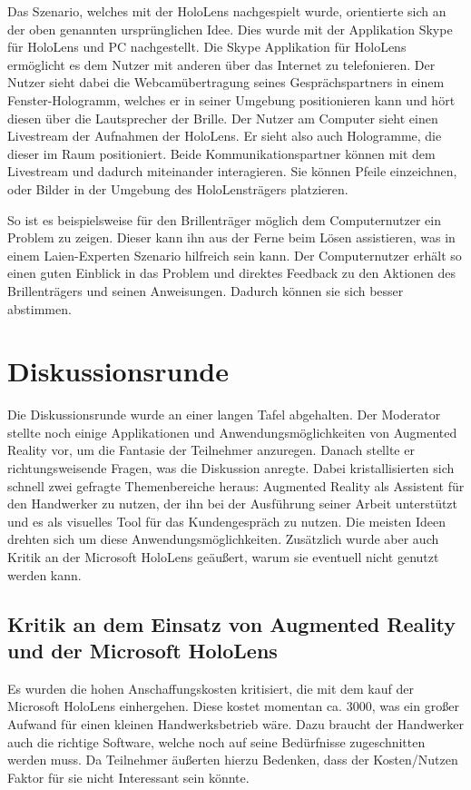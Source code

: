 Das Szenario, welches mit der HoloLens nachgespielt wurde, orientierte sich an der oben genannten ursprünglichen Idee. Dies wurde mit der Applikation Skype für HoloLens und PC nachgestellt. Die Skype Applikation für HoloLens ermöglicht es dem Nutzer mit anderen über das Internet zu telefonieren. Der Nutzer sieht dabei die Webcamübertragung seines Gesprächspartners in einem Fenster-Hologramm, welches er in seiner Umgebung positionieren kann und hört diesen über die Lautsprecher der Brille. Der Nutzer am Computer sieht einen Livestream der Aufnahmen der HoloLens. Er sieht also auch Hologramme, die dieser im Raum positioniert. Beide Kommunikationspartner können mit dem Livestream und dadurch miteinander interagieren. Sie können Pfeile einzeichnen, oder Bilder in der Umgebung des HoloLensträgers platzieren. 

So ist es beispielsweise für den Brillenträger möglich dem Computernutzer ein Problem zu zeigen. Dieser kann ihn aus der Ferne beim Lösen assistieren, was in einem Laien-Experten Szenario hilfreich sein kann. Der Computernutzer erhält so einen guten Einblick in das Problem und direktes Feedback zu den Aktionen des Brillenträgers und seinen Anweisungen. Dadurch können sie sich besser abstimmen.

\section{Diskussionsrunde}

Die Diskussionsrunde wurde an einer langen Tafel abgehalten. Der Moderator stellte noch einige Applikationen und Anwendungsmöglichkeiten von Augmented Reality vor, um die Fantasie der Teilnehmer anzuregen. Danach stellte er richtungsweisende Fragen, was die Diskussion anregte. Dabei kristallisierten sich schnell zwei gefragte Themenbereiche heraus: Augmented Reality als Assistent für den Handwerker zu nutzen, der ihn bei der Ausführung seiner Arbeit unterstützt und es als visuelles Tool für das Kundengespräch zu nutzen. Die meisten Ideen drehten sich um diese Anwendungsmöglichkeiten. Zusätzlich wurde aber auch Kritik an der Microsoft HoloLens geäußert, warum sie eventuell nicht genutzt werden kann.

\subsection{Kritik an dem Einsatz von Augmented Reality und der Microsoft HoloLens}

Es wurden die hohen Anschaffungskosten kritisiert, die mit dem kauf der Microsoft HoloLens einhergehen. Diese kostet momentan ca. 3000\EURdig, was ein großer Aufwand für einen kleinen Handwerksbetrieb wäre. Dazu braucht der Handwerker auch die richtige Software, welche noch auf seine Bedürfnisse zugeschnitten werden muss. Da Teilnehmer äußerten hierzu Bedenken, dass der Kosten/Nutzen Faktor für sie nicht Interessant sein könnte.


